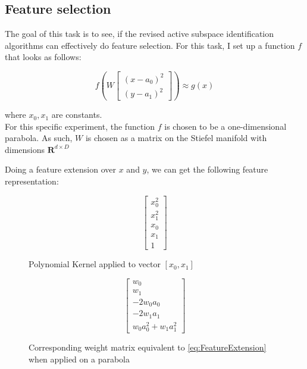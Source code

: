 \subsection{Feature selection}
The goal of this task is to see, if the revised active subspace identification algorithms can effectively do feature selection.
For this task, I set up a function $ f $ that looks as follows:

\def\B{
\begin{bmatrix}
    (x - a_0)^2 \\
    (y - a_1)^2
\end{bmatrix}}

\begin{equation} \label{eq:FeatureExtension}
f \left( W \B \right) \approx g \left( x \right)
\end{equation} 

where $x_0, x_1$ are constants. \\

For this specific experiment, the function $f$ is chosen to be a one-dimensional parabola. 
As such, $W$ is chosen as a matrix on the Stiefel manifold with dimensions $\mathbf{R}^{d \times D}$

Doing a feature extension over $x$ and $y$, we can get the following feature representation:

\def\PHI{
\begin{bmatrix}
	x_0^2 \\
	x_1^2 \\
	x_0 \\
	x_1 \\
    1
\end{bmatrix}}


\def\WtoPhi{
\begin{bmatrix}
	w_0 \\
    w_1 \\
	-2 w_0 a_0 \\
	-2 w_1 a_1 \\
	w_0 a_0^2 + w_1 a_1^2
\end{bmatrix}}

\begin{figure}[h]

\begin {minipage}{0.47\textwidth}
  \centering
  \begin{equation}
    \PHI
  \end{equation}
  \caption{Polynomial Kernel applied to vector $[x_0, x_1]$}
\end{minipage}
\hfill
\begin {minipage}{0.47\textwidth}
  \centering
  \begin{equation}
    \WtoPhi
  \end{equation}
  \caption{Corresponding weight matrix equivalent to \ref{eq:FeatureExtension} when applied on a parabola}
\end{minipage}

\end{figure}

